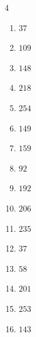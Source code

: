\begin{multicols}{4}
\begin{enumerate}
  \item $37$


  \item $109$


  \item $148$


  \item $218$


  \item $254$


  \item $149$


  \item $159$


  \item $92$


\columnbreak %

  \item $192$


  \item $206$


  \item $235$


  \item $37$


  \item $58$


  \item $201$


  \item $253$


  \item $143$


\end{enumerate}
\end{multicols}
